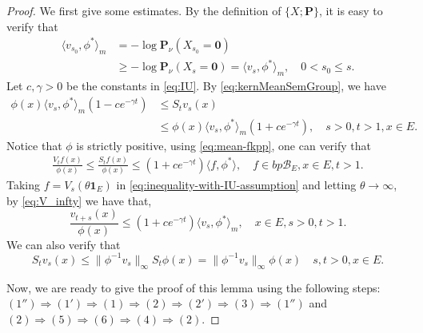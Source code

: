 \begin{proof}
	We first give some estimates.
	By the definition of $\{X;\mathbf P\}$, it is easy to verify that
\begin{equation}\label{eq:assertion1}
\begin{split}
	\langle v_{s_0},\phi^* \rangle_m
	&= -\log \mathbf P_\nu ( X_{s_0} = \mathbf 0 )\\
	& \geq -\log \mathbf P_\nu ( X_s = \mathbf 0 )
	= \langle v_s,\phi^* \rangle_m,
	\quad 0 < s_0\leq s.
\end{split}\end{equation}
	Let $c,\gamma > 0$ be the constants in \eqref{eq:IU}.
	By \eqref{eq:kernMeanSemGroup}, we have
\begin{equation}\label{eq:assertion2}\begin{split}
	\phi(x) \langle v_s , \phi^* \rangle_m (1 - ce^{-\gamma t})
	&\leq S_t v_s(x) \\
	&\leq \phi(x) \langle v_s , \phi^* \rangle_m (1 + ce^{-\gamma t}),
	\quad s>0,t>1,x\in E.
\end{split}\end{equation}
	Notice that $\phi$ is strictly positive, using \eqref{eq:mean-fkpp}, one can verify that
\begin{equation}\label{eq:inequality-with-IU-assumption}\begin{split}
	\frac{V_t f(x)}{\phi(x)}
	\leq \frac{S_t f(x)}{\phi(x)}
	\leq (1+ ce^{-\gamma t}) \langle f,\phi^*\rangle,
	\quad f\in bp\mathscr B_E,x\in E,t>1.
\end{split}\end{equation}
	Taking $f = V_s(\theta \mathbf 1_E)$ in \eqref{eq:inequality-with-IU-assumption} and letting $\theta \to \infty$, by \eqref{eq:V_infty} we have that,
\begin{equation}\label{eq:assertion3}
	\frac{v_{t+s}(x)}{\phi(x)}
	\leq (1+ ce^{-\gamma t}) \langle v_s,\phi^*\rangle_m,
	\quad x\in E,s>0,t>1.
\end{equation}
	We can also verify that
\begin{equation}\label{eq:assertion4}
	S_t v_s(x)
	\leq \|\phi^{-1}v_s\|_\infty  S_t \phi(x)
	= \|\phi^{-1}v_s\|_\infty \phi(x)
	\quad s,t>0,x\in E.
\end{equation}
\par
	Now, we are ready to give the proof of this lemma using the following steps: $(1'')\Rightarrow (1')\Rightarrow (1)\Rightarrow (2)\Rightarrow (2')\Rightarrow (3)\Rightarrow (1'')$ and $(2)\Rightarrow (5)\Rightarrow (6)\Rightarrow (4)\Rightarrow (2)$.

\end{proof}
